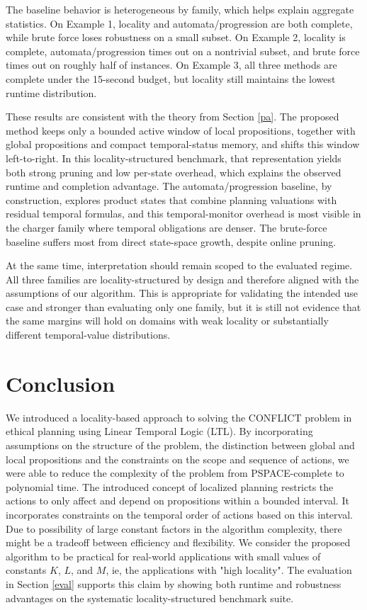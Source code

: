 \documentclass[]{jair}
\begin{document}
The baseline behavior is heterogeneous by family, which helps explain aggregate statistics. On Example 1, locality and automata/progression are both complete, while brute force loses robustness on a small subset. On Example 2, locality is complete, automata/progression times out on a nontrivial subset, and brute force times out on roughly half of instances. On Example 3, all three methods are complete under the 15-second budget, but locality still maintains the lowest runtime distribution.

These results are consistent with the theory from Section \ref{pa}. The proposed method keeps only a bounded active window of local propositions, together with global propositions and compact temporal-status memory, and shifts this window left-to-right. In this locality-structured benchmark, that representation yields both strong pruning and low per-state overhead, which explains the observed runtime and completion advantage. The automata/progression baseline, by construction, explores product states that combine planning valuations with residual temporal formulas, and this temporal-monitor overhead is most visible in the charger family where temporal obligations are denser. The brute-force baseline suffers most from direct state-space growth, despite online pruning.

At the same time, interpretation should remain scoped to the evaluated regime. All three families are locality-structured by design and therefore aligned with the assumptions of our algorithm. This is appropriate for validating the intended use case and stronger than evaluating only one family, but it is still not evidence that the same margins will hold on domains with weak locality or substantially different temporal-value distributions. %

\section{Conclusion}\label{conc}

We introduced a locality-based approach to solving the CONFLICT problem in ethical planning using Linear Temporal Logic (LTL). By incorporating assumptions on the structure of the problem, the distinction between global and local propositions and the constraints on the scope and sequence of actions, we were able to reduce the complexity of the problem from PSPACE-complete to polynomial time. The introduced concept of localized planning restricts the actions to only affect and depend on propositions within a bounded interval. It incorporates constraints on the temporal order of actions based on this interval. Due to possibility of large constant factors in the algorithm complexity, there might be a tradeoff between efficiency and flexibility. We consider the proposed algorithm to be practical   for real-world applications with small values of constants $K$, $L$, and $M$, ie, the applications with "high locality".
The evaluation in Section \ref{eval} supports this claim by showing both runtime and robustness advantages on the systematic locality-structured benchmark suite.
\end{document}
